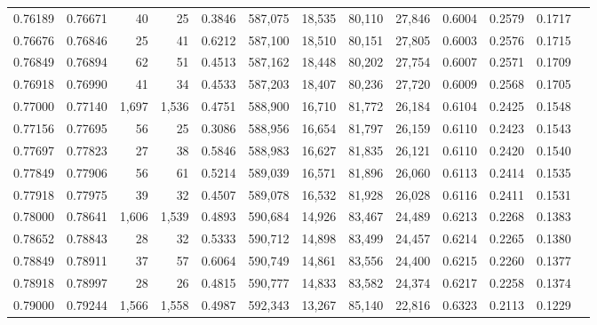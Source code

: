 \begin{tabular}{rrrrrrrrrrrrr}
0.76189 & 0.76671 &     40 &    25 &                                     0.3846 & 587,075 &  18,535 &  80,110 &  27,846 & 0.6004 & 0.2579 & 0.1717 \\
0.76676 & 0.76846 &     25 &    41 &                                     0.6212 & 587,100 &  18,510 &  80,151 &  27,805 & 0.6003 & 0.2576 & 0.1715 \\
0.76849 & 0.76894 &     62 &    51 &                                     0.4513 & 587,162 &  18,448 &  80,202 &  27,754 & 0.6007 & 0.2571 & 0.1709 \\
0.76918 & 0.76990 &     41 &    34 &                                     0.4533 & 587,203 &  18,407 &  80,236 &  27,720 & 0.6009 & 0.2568 & 0.1705 \\
0.77000 & 0.77140 &  1,697 & 1,536 &                                     0.4751 & 588,900 &  16,710 &  81,772 &  26,184 & 0.6104 & 0.2425 & 0.1548 \\
0.77156 & 0.77695 &     56 &    25 &                                     0.3086 & 588,956 &  16,654 &  81,797 &  26,159 & 0.6110 & 0.2423 & 0.1543 \\
0.77697 & 0.77823 &     27 &    38 &                                     0.5846 & 588,983 &  16,627 &  81,835 &  26,121 & 0.6110 & 0.2420 & 0.1540 \\
0.77849 & 0.77906 &     56 &    61 &                                     0.5214 & 589,039 &  16,571 &  81,896 &  26,060 & 0.6113 & 0.2414 & 0.1535 \\
0.77918 & 0.77975 &     39 &    32 &                                     0.4507 & 589,078 &  16,532 &  81,928 &  26,028 & 0.6116 & 0.2411 & 0.1531 \\
0.78000 & 0.78641 &  1,606 & 1,539 &                                     0.4893 & 590,684 &  14,926 &  83,467 &  24,489 & 0.6213 & 0.2268 & 0.1383 \\
0.78652 & 0.78843 &     28 &    32 &                                     0.5333 & 590,712 &  14,898 &  83,499 &  24,457 & 0.6214 & 0.2265 & 0.1380 \\
0.78849 & 0.78911 &     37 &    57 &                                     0.6064 & 590,749 &  14,861 &  83,556 &  24,400 & 0.6215 & 0.2260 & 0.1377 \\
0.78918 & 0.78997 &     28 &    26 &                                     0.4815 & 590,777 &  14,833 &  83,582 &  24,374 & 0.6217 & 0.2258 & 0.1374 \\
0.79000 & 0.79244 &  1,566 & 1,558 &                                     0.4987 & 592,343 &  13,267 &  85,140 &  22,816 & 0.6323 & 0.2113 & 0.1229 \\

\end{tabular}
